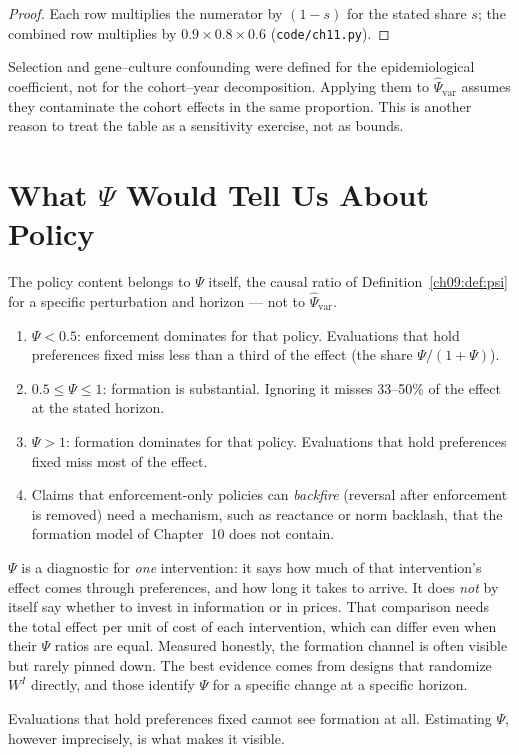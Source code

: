\documentclass[../structural_economics_book.tex]{subfiles}
\begin{document}
\begin{proof}
Each row multiplies the numerator by $(1 - s)$ for the stated share $s$; the combined row multiplies by $0.9 \times 0.8 \times 0.6$ (\texttt{code/ch11.py}).
\end{proof}

Selection and gene--culture confounding were defined for the epidemiological coefficient, not for the cohort--year decomposition. Applying them to $\hat{\Psi}_{\text{var}}$ assumes they contaminate the cohort effects in the same proportion. This is another reason to treat the table as a sensitivity exercise, not as bounds.


\section{What $\Psi$ Would Tell Us About Policy}
\label{ch11:sec:policy}

The policy content belongs to $\Psi$ itself, the causal ratio of Definition~\ref{ch09:def:psi} for a specific perturbation and horizon --- not to $\hat{\Psi}_{\text{var}}$.

\begin{remark}\label{ch11:prop:policy}
\leavevmode
\begin{enumerate}
\item \textbf{$\Psi < 0.5$}: enforcement dominates for that policy. Evaluations that hold preferences fixed miss less than a third of the effect (the share $\Psi/(1+\Psi)$).
\item \textbf{$0.5 \leq \Psi \leq 1$}: formation is substantial. Ignoring it misses 33--50\% of the effect at the stated horizon.
\item \textbf{$\Psi > 1$}: formation dominates for that policy. Evaluations that hold preferences fixed miss most of the effect.
\item Claims that enforcement-only policies can \textit{backfire} (reversal after enforcement is removed) need a mechanism, such as reactance or norm backlash, that the formation model of Chapter~10 does not contain.
\end{enumerate}
\end{remark}

\begin{keyinsight}
$\Psi$ is a diagnostic for \textit{one} intervention: it says how much of that intervention's effect comes through preferences, and how long it takes to arrive. It does \textit{not} by itself say whether to invest in information or in prices. That comparison needs the total effect per unit of cost of each intervention, which can differ even when their $\Psi$ ratios are equal. Measured honestly, the formation channel is often visible but rarely pinned down. The best evidence comes from designs that randomize $W^I$ directly, and those identify $\Psi$ for a specific change at a specific horizon.

Evaluations that hold preferences fixed cannot see formation at all. Estimating $\Psi$, however imprecisely, is what makes it visible.
\end{keyinsight}
\end{document}
